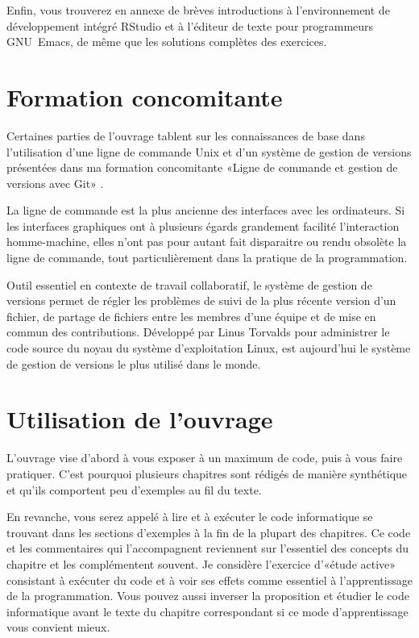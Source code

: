 Enfin, vous trouverez en annexe de brèves introductions à
l'environnement de développement intégré RStudio et à l'éditeur de
texte pour programmeurs GNU~Emacs, de même que les solutions complètes
des exercices.

\section*{Formation concomitante}

Certaines parties de l'ouvrage tablent sur les connaissances de base
dans l'utilisation d'une ligne de commande Unix et d'un système de
gestion de versions présentées dans ma formation concomitante «Ligne
de commande et gestion de versions avec Git»
\citep{Goulet:laboratoire-cli-git:2020}.

La ligne de commande est la plus ancienne des interfaces avec les
ordinateurs. Si les interfaces graphiques ont à plusieurs égards
grandement facilité l'interaction homme-machine, elles n'ont pas pour
autant fait disparaitre ou rendu obsolète la ligne de commande, tout
particulièrement dans la pratique de la programmation.

Outil essentiel en contexte de travail collaboratif, le système de
gestion de versions permet de régler les problèmes de suivi de la plus
récente version d'un fichier, de partage de fichiers entre les membres
d'une équipe et de mise en commun des contributions. Développé par
Linus Torvalds pour administrer le code source du noyau du système
d'exploitation Linux,  est aujourd'hui
le système de gestion de versions le plus utilisé dans le monde.


\section*{Utilisation de l'ouvrage}

L'ouvrage vise d'abord à vous exposer à un maximum de code, puis à
vous faire pratiquer. C'est pourquoi plusieurs chapitres sont rédigés
de manière synthétique et qu'ils comportent peu d'exemples au fil du
texte.

En revanche, vous serez appelé à lire et à exécuter le code
informatique se trouvant dans les sections d'exemples à la fin de la
plupart des chapitres. Ce code et les commentaires qui l'accompagnent
reviennent sur l'essentiel des concepts du chapitre et les
complémentent souvent. Je considère l'exercice d'«étude active»
consistant à exécuter du code et à voir ses effets comme essentiel à
l'apprentissage de la programmation. Vous pouvez aussi inverser la
proposition et étudier le code informatique avant le texte du chapitre
correspondant si ce mode d'apprentissage vous convient mieux.

